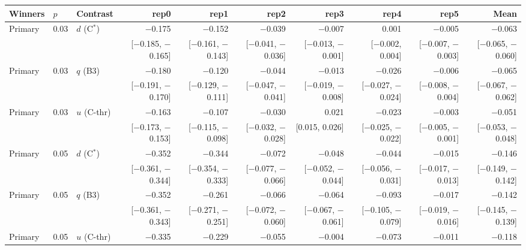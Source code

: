\begin{tabular}{lllrrrrrrr}
\toprule
Winners & $p$ & Contrast & rep0 & rep1 & rep2 & rep3 & rep4 & rep5 & Mean \\
\midrule
Primary & 0.03 & $d$ (C$^*$) & $-$0.175 & $-$0.152 & $-$0.039 & $-$0.007 & 0.001 & $-$0.005 & $-$0.063 \\
 &  &  & {\scriptsize [$-$0.185, $-$0.165]} & {\scriptsize [$-$0.161, $-$0.143]} & {\scriptsize [$-$0.041, $-$0.036]} & {\scriptsize [$-$0.013, $-$0.001]} & {\scriptsize [$-$0.002, 0.004]} & {\scriptsize [$-$0.007, $-$0.003]} & {\scriptsize [$-$0.065, $-$0.060]} \\
Primary & 0.03 & $q$ (B3) & $-$0.180 & $-$0.120 & $-$0.044 & $-$0.013 & $-$0.026 & $-$0.006 & $-$0.065 \\
 &  &  & {\scriptsize [$-$0.191, $-$0.170]} & {\scriptsize [$-$0.129, $-$0.111]} & {\scriptsize [$-$0.047, $-$0.041]} & {\scriptsize [$-$0.019, $-$0.008]} & {\scriptsize [$-$0.027, $-$0.024]} & {\scriptsize [$-$0.008, $-$0.004]} & {\scriptsize [$-$0.067, $-$0.062]} \\
Primary & 0.03 & $u$ (C-thr) & $-$0.163 & $-$0.107 & $-$0.030 & 0.021 & $-$0.023 & $-$0.003 & $-$0.051 \\
 &  &  & {\scriptsize [$-$0.173, $-$0.153]} & {\scriptsize [$-$0.115, $-$0.098]} & {\scriptsize [$-$0.032, $-$0.028]} & {\scriptsize [0.015, 0.026]} & {\scriptsize [$-$0.025, $-$0.022]} & {\scriptsize [$-$0.005, $-$0.001]} & {\scriptsize [$-$0.053, $-$0.048]} \\
Primary & 0.05 & $d$ (C$^*$) & $-$0.352 & $-$0.344 & $-$0.072 & $-$0.048 & $-$0.044 & $-$0.015 & $-$0.146 \\
 &  &  & {\scriptsize [$-$0.361, $-$0.344]} & {\scriptsize [$-$0.354, $-$0.333]} & {\scriptsize [$-$0.077, $-$0.066]} & {\scriptsize [$-$0.052, $-$0.044]} & {\scriptsize [$-$0.056, $-$0.031]} & {\scriptsize [$-$0.017, $-$0.013]} & {\scriptsize [$-$0.149, $-$0.142]} \\
Primary & 0.05 & $q$ (B3) & $-$0.352 & $-$0.261 & $-$0.066 & $-$0.064 & $-$0.093 & $-$0.017 & $-$0.142 \\
 &  &  & {\scriptsize [$-$0.361, $-$0.343]} & {\scriptsize [$-$0.271, $-$0.251]} & {\scriptsize [$-$0.072, $-$0.060]} & {\scriptsize [$-$0.067, $-$0.061]} & {\scriptsize [$-$0.105, $-$0.079]} & {\scriptsize [$-$0.019, $-$0.016]} & {\scriptsize [$-$0.145, $-$0.139]} \\
Primary & 0.05 & $u$ (C-thr) & $-$0.335 & $-$0.229 & $-$0.055 & $-$0.004 & $-$0.073 & $-$0.011 & $-$0.118 \\

\end{tabular}
